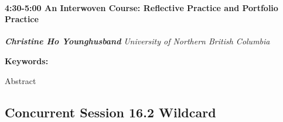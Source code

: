 \documentclass[
]{book}
\begin{document}
\begin{session}
\hypertarget{an-interwoven-course-reflective-practice-and-portfolio-practice}{%
\paragraph*{\texorpdfstring{4:30-5:00 \textbar{} \textbf{An Interwoven
Course: Reflective Practice and Portfolio} \textbar{}
Practice}{4:30-5:00 \textbar{} An Interwoven Course: Reflective Practice and Portfolio \textbar{} Practice}}\label{an-interwoven-course-reflective-practice-and-portfolio-practice}}

\textbf{\emph{Christine Ho Younghusband}} \textbar{} \emph{University of
Northern British Columbia}

\textbf{Keywords:}

Abstract
\end{session}

\hypertarget{concurrent-session-16.2-wildcard}{%
\subsection*{Concurrent Session 16.2 \textbar{} Wildcard}\label{concurrent-session-16.2-wildcard}}
\end{document}
